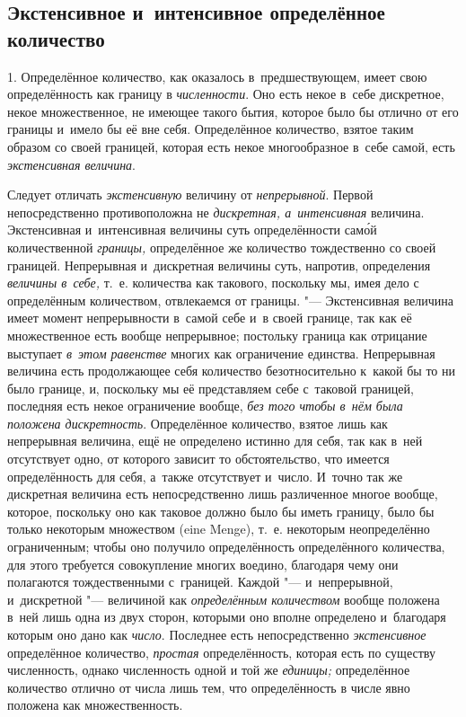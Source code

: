 \subsection{Экстенсивное и~интенсивное определённое количество}


1. Определённое количество, как оказалось в~предшествующем, имеет свою
определённость как границу в {\em численности}. Оно есть некое в~себе дискретное,
некое множественное, не имеющее такого бытия, которое было бы отлично от его
границы и~имело бы её вне себя. Определённое количество, взятое таким образом
со своей границей, которая есть некое многообразное в~себе самой, есть
{\em экстенсивная величина}.

Следует отличать {\em экстенсивную} величину от {\em непрерывной}. Первой
непосредственно противоположна не {\em дискретная, а~интенсивная}
величина. Экстенсивная и~интенсивная величины суть определённости сам\'{о}й
количественной {\em границы,} определённое же количество тождественно со своей
границей. Непрерывная и~дискретная величины суть, напротив, определения
{\em величины в~себе,} т.~е. количества как такового, поскольку мы, имея дело
с определённым количеством, отвлекаемся от границы. "--- Экстенсивная величина
имеет момент непрерывности в~самой себе и~в своей границе, так как её
множественное есть вообще непрерывное; постольку граница как отрицание
выступает {\em в~этом равенстве} многих как ограничение единства. Непрерывная
величина есть продолжающее себя количество безотносительно к~какой бы то ни
было границе, и, поскольку мы её представляем себе с~таковой границей,
последняя есть некое ограничение вообще, {\em без того чтобы в~нём была
положена дискретность}. Определённое количество, взятое лишь как непрерывная
величина, ещё не определено истинно для себя, так как в~ней отсутствует одно,
от которого зависит то обстоятельство, что имеется определённость для себя,
а~также отсутствует и~число. И~точно так же дискретная величина есть
непосредственно лишь различенное многое вообще, которое, поскольку оно как
таковое должно было бы иметь границу, было бы только некоторым множеством (eine
Men\-ge), т.~е. некоторым неопределённо ограниченным; чтобы оно получило
определённость определённого количества, для этого требуется совокупление
многих воедино, благодаря чему они полагаются тождественными с~границей.
Каждой "--- и~непрерывной, и~дискретной "--- величиной как
{\em определённым количеством} вообще положена в~ней лишь одна из двух сторон,
которыми оно вполне определено и~благодаря которым оно дано
как {\em число}. Последнее
есть непосредственно {\em экстенсивное} определённое количество, {\em простая}
определённость, которая есть по существу численность, однако численность одной
и той же {\em единицы;} определённое количество отлично от числа лишь тем, что определённость
в числе явно положена как множественность.

